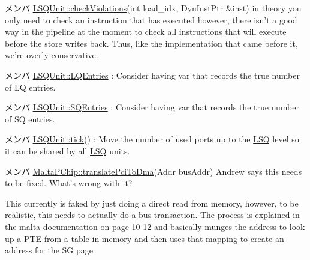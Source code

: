 \label{todo__todo000039}
\hypertarget{todo__todo000039}{}
 
\begin{DoxyDescription}
\item[メンバ \hyperlink{classLSQUnit_a15239c5725d8744a793c867193e4bce7}{LSQUnit::checkViolations}(int load\_\-idx, DynInstPtr \&inst) ]in theory you only need to check an instruction that has executed however, there isn't a good way in the pipeline at the moment to check all instructions that will execute before the store writes back. Thus, like the implementation that came before it, we're overly conservative. 
\end{DoxyDescription}

\label{todo__todo000036}
\hypertarget{todo__todo000036}{}
 
\begin{DoxyDescription}
\item[メンバ \hyperlink{classLSQUnit_aafa99d800d574095881acbacdbbbcc47}{LSQUnit::LQEntries} ]: Consider having var that records the true number of LQ entries. 
\end{DoxyDescription}

\label{todo__todo000037}
\hypertarget{todo__todo000037}{}
 
\begin{DoxyDescription}
\item[メンバ \hyperlink{classLSQUnit_a38c8af5392da70119dc5cce4e3637cbc}{LSQUnit::SQEntries} ]: Consider having var that records the true number of SQ entries. 
\end{DoxyDescription}

\label{todo__todo000035}
\hypertarget{todo__todo000035}{}
 
\begin{DoxyDescription}
\item[メンバ \hyperlink{classLSQUnit_a873dd91783f9efb4a590aded1f70d6b0}{LSQUnit::tick}() ]: Move the number of used ports up to the \hyperlink{classLSQ}{LSQ} level so it can be shared by all \hyperlink{classLSQ}{LSQ} units. 
\end{DoxyDescription}

\label{todo__todo000065}
\hypertarget{todo__todo000065}{}
 
\begin{DoxyDescription}
\item[メンバ \hyperlink{classMaltaPChip_a5de3f8c8c47bf4bb58e072f54f4a7cba}{MaltaPChip::translatePciToDma}(Addr busAddr) ]Andrew says this needs to be fixed. What's wrong with it? 

This currently is faked by just doing a direct read from memory, however, to be realistic, this needs to actually do a bus transaction. The process is explained in the malta documentation on page 10-\/12 and basically munges the address to look up a PTE from a table in memory and then uses that mapping to create an address for the SG page 
\end{DoxyDescription}

